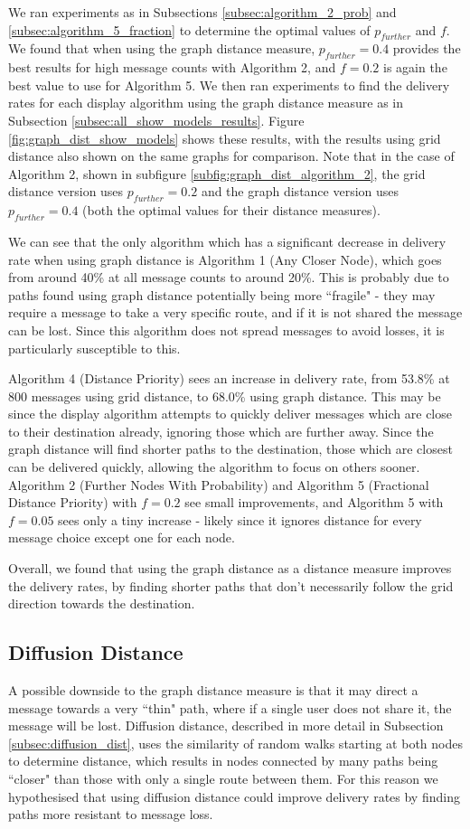 \documentclass[bsc,frontabs,twoside,singlespacing,parskip,deptreport]{infthesis}     %
\begin{document}
We ran experiments as in Subsections \ref{subsec:algorithm_2_prob} and \ref{subsec:algorithm_5_fraction} to determine the optimal values of $p_{further}$ and $f$. We found that when using the graph distance measure, $p_{further}=0.4$ provides the best results for high message counts with Algorithm 2, and $f=0.2$ is again the best value to use for Algorithm 5. We then ran experiments to find the delivery rates for each display algorithm using the graph distance measure as in Subsection \ref{subsec:all_show_models_results}. Figure \ref{fig:graph_dist_show_models} shows these results, with the results using grid distance also shown on the same graphs for comparison. Note that in the case of Algorithm 2, shown in subfigure \ref{subfig:graph_dist_algorithm_2}, the grid distance version uses $p_{further}=0.2$ and the graph distance version uses $p_{further}=0.4$ (both the optimal values for their distance measures).

We can see that the only algorithm which has a significant decrease in delivery rate when using graph distance is Algorithm 1 (Any Closer Node), which goes from around 40\% at all message counts to around 20\%. This is probably due to paths found using graph distance potentially being more ``fragile" - they may require a message to take a very specific route, and if it is not shared the message can be lost. Since this algorithm does not spread messages to avoid losses, it is particularly susceptible to this.

Algorithm 4 (Distance Priority) sees an increase in delivery rate, from 53.8\% at 800 messages using grid distance, to 68.0\% using graph distance. This may be since the display algorithm attempts to quickly deliver messages which are close to their destination already, ignoring those which are further away. Since the graph distance will find shorter paths to the destination, those which are closest can be delivered quickly, allowing the algorithm to focus on others sooner. Algorithm 2 (Further Nodes With Probability) and Algorithm 5 (Fractional Distance Priority) with $f=0.2$ see small improvements, and Algorithm 5 with $f=0.05$ sees only a tiny increase - likely since it ignores distance for every message choice except one for each node.

Overall, we found that using the graph distance as a distance measure improves the delivery rates, by finding shorter paths that don't necessarily follow the grid direction towards the destination.

\subsection{Diffusion Distance}
A possible downside to the graph distance measure is that it may direct a message towards a very ``thin" path, where if a single user does not share it, the message will be lost. Diffusion distance, described in more detail in Subsection \ref{subsec:diffusion_dist}, uses the similarity of random walks starting at both nodes to determine distance, which results in nodes connected by many paths being ``closer" than those with only a single route between them. For this reason we hypothesised that using diffusion distance could improve delivery rates by finding paths more resistant to message loss.
\end{document}

